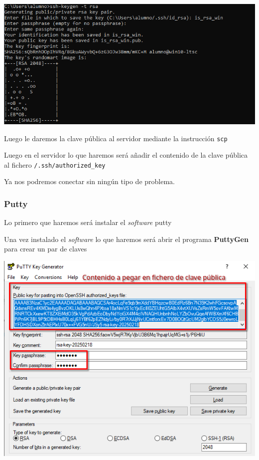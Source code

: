 \documentclass[11pt]{article}
\begin{document}
\begin{center}
\includegraphics[width=.9\linewidth]{./media/ssh-keygen-win.png}
\end{center}

Luego le daremos la clave pública al servidor mediante la instrucción \texttt{scp}

Luego en el servidor lo que haremos será añadir el contenido de la clave pública al fichero \texttt{/.ssh/authorized\_key}

Ya nos podremos conectar sin ningún tipo de problema.

\subsubsection{Putty}
\label{sec:org5356944}
Lo primero que haremos será instalar el \emph{software} putty

Una vez instalado el \emph{software} lo que haremos será abrir el programa \textbf{PuttyGen} para crear un par de claves

\begin{center}
\includegraphics[width=.9\linewidth]{./media/win-puttygen.png}
\end{center}
\end{document}
